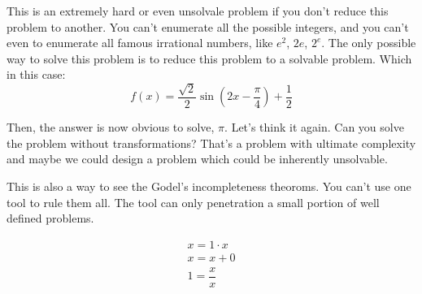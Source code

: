 This is an extremely hard or even unsolvale problem if you don't reduce this problem to another. You can't enumerate all the possible integers, and you can't even to enumerate all famous irrational numbers, like $e^2$, $2e$, $2^e$. The only possible way to solve this problem is to reduce this problem to a solvable problem. Which in this case:
\[ f(x) = \dfrac{\sqrt{2}}{2}\sin{\left(2x - \dfrac{\pi}{4}\right)} + \dfrac{1}{2} \]

Then, the answer is now obvious to solve, $\pi$. Let's think it again. Can you solve the problem without transformations? That's a problem with ultimate complexity and maybe we could design a problem which could be inherently unsolvable.

This is also a way to see the Godel's incompleteness theoroms. You can't use one tool to rule them all. The tool can only penetration a small portion of well defined problems.

\begin{example}
\begin{align*}
  x = 1\cdot x \\
  x = x + 0 \\
  1 = \dfrac{x}{x}
\end{align*}
\end{example}
